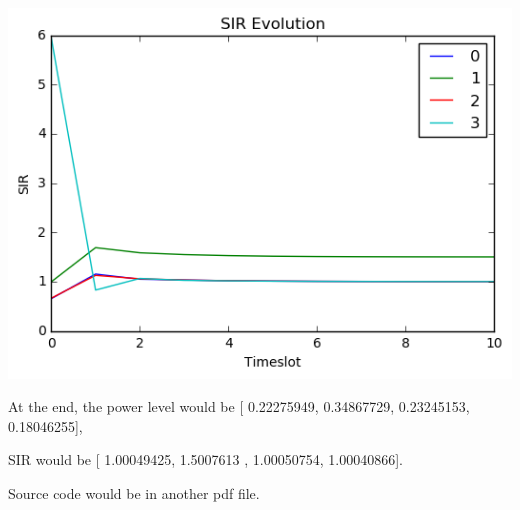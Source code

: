 \documentclass[12pt,a4paper]{article}
\begin{document}
\includegraphics[width=\textwidth]{PIC/b-2.png}

At the end, the power level would be [ 0.22275949,  0.34867729,  0.23245153,  0.18046255],

SIR would be [ 1.00049425,  1.5007613 ,  1.00050754,  1.00040866].

Source code would be in another pdf file.
\end{document}
